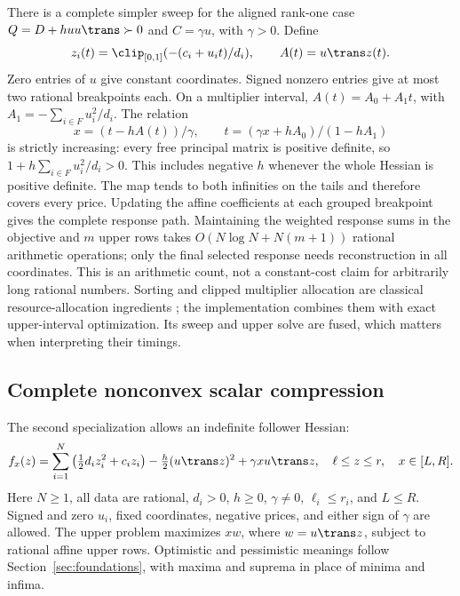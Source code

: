 There is a complete simpler sweep for the aligned rank-one case
$Q=D+h uu\trans\succ0$ and $C=\gamma u$, with $\gamma>0$. Define
\[
 z_i(t)=\clip_{[0,1]}(-(c_i+u_it)/d_i),\qquad A(t)=u\trans z(t).
\]
Zero entries of $u$ give constant coordinates. Signed nonzero entries give
at most two rational breakpoints each. On a multiplier interval,
$A(t)=A_0+A_1t$, with $A_1=-\sum_{i\in F}u_i^2/d_i$. The relation
\begin{equation}\label{eq:convex-sweep-inversion}
 x=(t-hA(t))/\gamma,\qquad
 t=(\gamma x+hA_0)/(1-hA_1)
\end{equation}
is strictly increasing: every free principal matrix is positive definite,
so $1+h\sum_{i\in F}u_i^2/d_i>0$. This includes negative $h$ whenever the
whole Hessian is positive definite. The map tends to both infinities on the
tails and therefore covers every price. Updating the affine coefficients at
each grouped breakpoint gives the complete response path. Maintaining the
weighted response sums in the objective and $m$ upper rows takes
$O(N\log N+N(m+1))$ rational arithmetic operations; only the final selected
response needs reconstruction in all coordinates. This is an arithmetic count,
not a constant-cost claim for arbitrarily long rational numbers.
Sorting and clipped multiplier allocation are classical resource-allocation
ingredients \citep{Kiwiel2008}; the implementation combines them with exact
upper-interval optimization. Its sweep and upper solve are fused, which matters
when interpreting their timings.

\subsection{Complete nonconvex scalar compression}
\label{subsec:nonconvex-compression}
The second specialization allows an indefinite follower Hessian:
\begin{equation}\label{eq:nonconvex-implemented}
 f_x(z)=\sum_{i=1}^N\left(\tfrac12d_i z_i^2+c_i z_i\right)
       -\tfrac h2(u\trans z)^2+\gamma x u\trans z,
 \quad \ell\le z\le r,\quad x\in[L,R].
\end{equation}
Here $N\ge1$, all data are rational, $d_i>0$, $h\ge0$, $\gamma\ne0$, $\ell_i\le r_i$,
and $L\le R$. Signed and zero $u_i$, fixed coordinates, negative prices,
and either sign of $\gamma$ are allowed. The upper problem maximizes $xw$,
where $w=u\trans z$, subject to rational affine upper rows. Optimistic and
pessimistic meanings follow Section~\ref{sec:foundations}, with maxima and
suprema in place of minima and infima.

